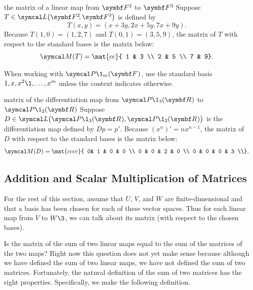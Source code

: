\begin{example}{the matrix of a linear map from\/ $\F2$ to\/ $\F3$}
Suppose $T \in \L\paren[\big]{\FF{2}, \F{3}}$ is defined by
\[
T(x, y) = (x + 3y, 2x + 5y, 7x + 9y).
\]
Because $T(1,0) = (1, 2, 7)$ and $T(0,1) = (3, 5, 9)$, the matrix of
$T$ with respect to the standard bases is the  matrix below:
\[
\M(T) =
\mat{cc}{
1 & 3 \\
2 & 5 \\
7 & 9}.
\vspace{1bp}
\]
\end{example}

When working with $\P\1_m(\F{})$, use the standard basis $1, x, x^2\1, \dots, x^m$ unless the context indicates otherwise.

\begin{example}[diffmatrix]{matrix of the differentiation map from $\P\1_3(\R{})$ to $\P\1_2(\R{})$}
Suppose $D \in \L\bigl(\P\1_3(\R{}), \P\1_2(\R{}) \bigr)$ is the differentiation map defined by $Dp = p'\!$.
Because ${(x^n)}' = nx^{n-1}\!$, the matrix of $D$ with respect to the standard bases is the  matrix below:
\vspace{-6bp}
\[
\M(D) =
\mat{cccc}{
0& 1 & 0 & 0 \\
0 & 0 & 2 & 0 \\
0 & 0 & 0 & 3 \\}.
\vspace{1bp}
\]
\end{example}

\subsection{Addition and Scalar Multiplication of Matrices}

For the rest of this section, assume that $U$, $V$, and $W$ are finite-dimensional and that a basis has been chosen for each of these vector spaces. Thus for each linear map from $V$ to $W\3$, we can talk about its matrix
(with respect to the chosen bases).

Is the matrix of the sum of two linear maps equal to the sum of the matrices of the two maps?
Right now this question does not yet make sense because although we have defined the sum of two linear maps, we have not defined the sum of two matrices.  Fortunately, the natural definition of the sum of two matrices has the right properties. Specifically, we make the following definition.

